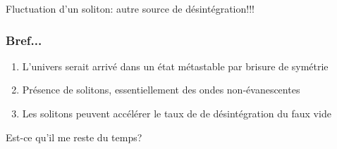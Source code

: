 \documentclass[handout]{beamer}
\begin{document}
\begin{frame}
Fluctuation d'un soliton: autre source de désintégration!!!\\
\end{frame}

\begin{frame}\frametitle{Bref...}
\begin{enumerate}
\item L'univers serait arrivé dans un état métastable par brisure de symétrie
\item Présence de solitons, essentiellement des ondes non-évanescentes
\item Les solitons peuvent accélérer le taux de de désintégration du faux vide
\end{enumerate}
Est-ce qu'il me reste du temps?
\end{frame}



\end{document}
